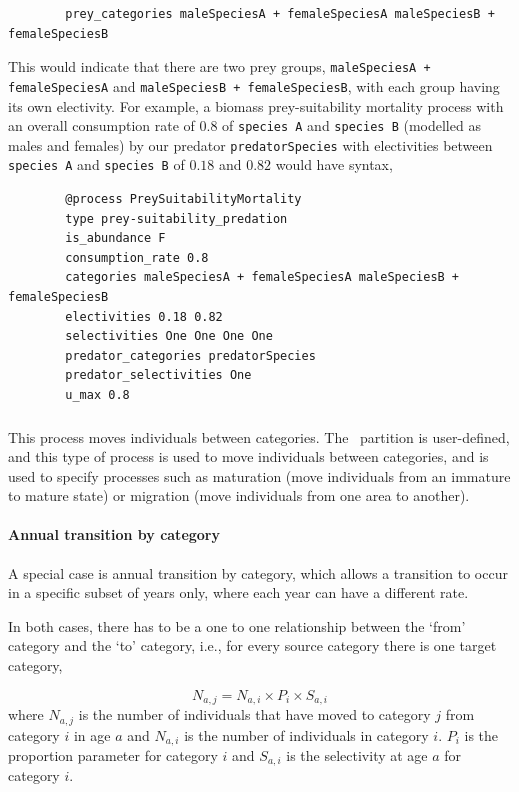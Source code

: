 {\small{\begin{verbatim}
		prey_categories maleSpeciesA + femaleSpeciesA maleSpeciesB + femaleSpeciesB
		\end{verbatim}}}

This would indicate that there are two prey groups, \texttt{maleSpeciesA + femaleSpeciesA} and \texttt{maleSpeciesB + femaleSpeciesB}, with each group having its own electivity. For example, a biomass prey-suitability mortality process with an overall consumption rate of $0.8$ of \texttt{species A} and \texttt{species B} (modelled as males and females) by our predator \texttt{predatorSpecies} with electivities between \texttt{species A} and \texttt{species B} of $0.18$ and $0.82$ would have syntax,

{\small{\begin{verbatim}
		@process PreySuitabilityMortality
		type prey-suitability_predation
		is_abundance F
		consumption_rate 0.8
		categories maleSpeciesA + femaleSpeciesA maleSpeciesB + femaleSpeciesB
		electivities 0.18 0.82
		selectivities One One One One
		predator_categories predatorSpecies
		predator_selectivities One
		u_max 0.8
		\end{verbatim}}}

\subsubsection{}

This process moves individuals between categories. The \CNAME\ partition is user-defined, and this type of process is used to move individuals between categories, and is used to specify processes such as maturation (move individuals from an immature to mature state) or migration (move individuals from one area to another).

\paragraph{Annual transition by category}

A special case is annual transition by category, which allows a transition to occur in a specific subset of years only, where each year can have a different rate.

In both cases, there has to be a one to one relationship between the `from' category and the `to' category, i.e., for every source category there is one target category,

\begin{equation}
	N_{a,j} = N_{a,i} \times P_i \times S_{a,i}
\end{equation}
where $N_{a,j}$ is the number of individuals that have moved to category $j$ from category $i$ in age $a$ and $N_{a,i}$ is the number of individuals in category $i$. $P_i$ is the proportion parameter for category $i$ and $S_{a,i}$ is the selectivity at age $a$ for category $i$.


